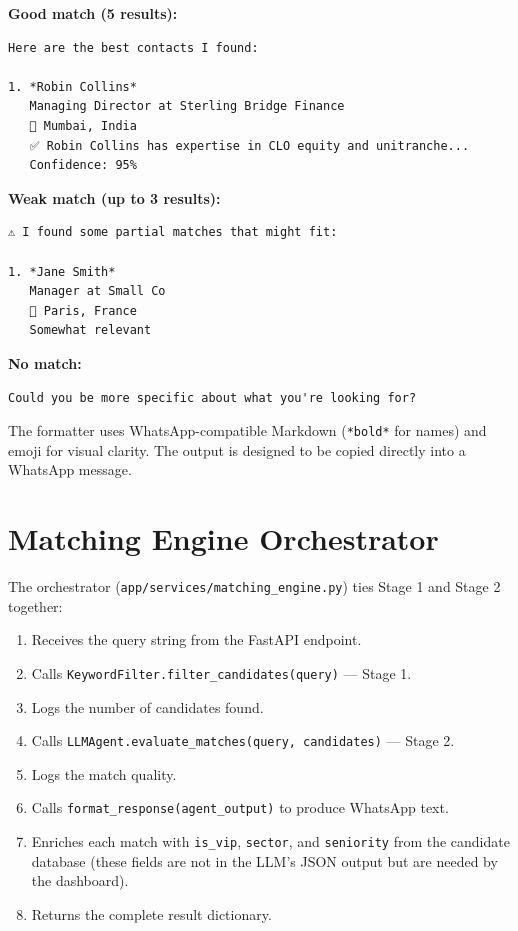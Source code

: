 \documentclass[12pt, a4paper]{report}
\begin{document}
\textbf{Good match (5 results):}
\begin{verbatim}
Here are the best contacts I found:

1. *Robin Collins*
   Managing Director at Sterling Bridge Finance
   📍 Mumbai, India
   ✅ Robin Collins has expertise in CLO equity and unitranche...
   Confidence: 95%
\end{verbatim}

\textbf{Weak match (up to 3 results):}
\begin{verbatim}
⚠️ I found some partial matches that might fit:

1. *Jane Smith*
   Manager at Small Co
   📍 Paris, France
   Somewhat relevant
\end{verbatim}

\textbf{No match:}
\begin{verbatim}
Could you be more specific about what you're looking for?
\end{verbatim}

The formatter uses WhatsApp-compatible Markdown (\texttt{*bold*} for names) and emoji for visual clarity. The output is designed to be copied directly into a WhatsApp message.

\section{Matching Engine Orchestrator}

The orchestrator (\texttt{app/services/matching\_engine.py}) ties Stage 1 and Stage 2 together:

\begin{enumerate}[itemsep=3pt]
    \item Receives the query string from the FastAPI endpoint.
    \item Calls \texttt{KeywordFilter.filter\_candidates(query)} --- Stage 1.
    \item Logs the number of candidates found.
    \item Calls \texttt{LLMAgent.evaluate\_matches(query, candidates)} --- Stage 2.
    \item Logs the match quality.
    \item Calls \texttt{format\_response(agent\_output)} to produce WhatsApp text.
    \item Enriches each match with \texttt{is\_vip}, \texttt{sector}, and \texttt{seniority} from the candidate database (these fields are not in the LLM's JSON output but are needed by the dashboard).
    \item Returns the complete result dictionary.
\end{enumerate}
\end{document}
